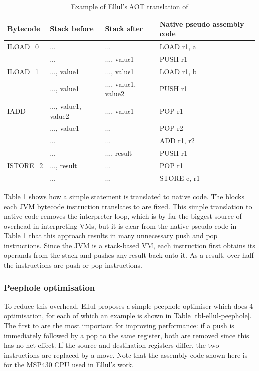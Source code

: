 \begin{table}
\caption{Example of Ellul's AOT translation of }
\label{tbl-ellul-aot-example}
    \begin{tabular}{llll}
    \toprule
    Bytecode  & Stack before        & Stack after         & Native pseudo assembly code \\
    \midrule
    \midrule
    ILOAD\_0  & ...                 & ...                 & LOAD r1, a \\
              & ...                 & ..., value1         & PUSH r1 \\
    ILOAD\_1  & ..., value1         & ..., value1         & LOAD r1, b \\
              & ..., value1         & ..., value1, value2 & PUSH r1 \\
    IADD      & ..., value1, value2 & ..., value1         & POP r1 \\
              & ..., value1         & ...                 & POP r2 \\
              & ...                 & ...                 & ADD r1, r2 \\
              & ...                 & ..., result         & PUSH r1 \\
    ISTORE\_2 & ..., result         & ...                 & POP r1 \\
              & ...                 & ...                 & STORE c, r1 \\
    \bottomrule
    \end{tabular}
\end{table}

Table \ref{tbl-ellul-aot-example} shows how a simple statement is translated to native code. The blocks each JVM bytecode instruction translates to are fixed. This simple translation to native code removes the interpreter loop, which is by far the biggest source of overhead in interpreting VMs, but it is clear from the native pseudo code in Table \ref{tbl-ellul-aot-example} that this approach results in many unnecessary push and pop instructions. Since the JVM is a stack-based VM, each instruction first obtains its operands from the stack and pushes any result back onto it. As a result, over half the instructions are push or pop instructions.

\subsubsection{Peephole optimisation}
To reduce this overhead, Ellul proposes a simple peephole optimiser \cite{Ellul:2012thesis} which does 4 optimisation, for each of which an example is shown in Table \ref{tbl-ellul-peephole}. The first to are the most important for improving performance: if a push is immediately followed by a pop to the same register, both are removed since this has no net effect. If the source and destination registers differ, the two instructions are replaced by a move. Note that the assembly code shown here is for the MSP430 CPU used in Ellul's work.

